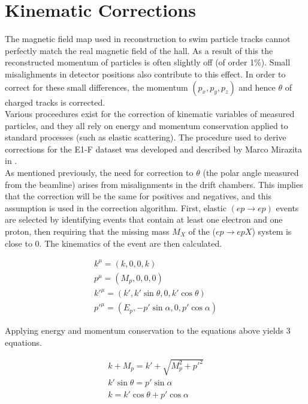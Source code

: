 \section{Kinematic Corrections}
The magnetic field map used in reconstruction to swim particle tracks cannot perfectly match the real magnetic field of the hall.  As a result of this the reconstructed momentum of particles is often slightly off (of order 1\%).  Small misalighments in detector positions also contribute to this effect.  In order to correct for these small differences, the momentum $(p_x, p_y, p_z)$ and hence $\theta$ of charged tracks is corrected. \\

Various proceedures exist for the correction of kinematic variables of measured particles, and they all rely on energy and momentum conservation applied to standard processes (such as elastic scattering).  The procedure used to derive corrections for the E1-F dataset was developed and described by Marco Mirazita in \cite{misc-mirazita:2010}.  \\

As mentioned previously, the need for correction to $\theta$ (the polar angle measured from the beamline) arises from misalignments in the drift chambers.  This implies that the correction will be the same for positives and negatives, and this assumption is used in the correction algorithm.  First, elastic $(ep \rightarrow ep)$ events are selected by identifying events that contain at least one electron and one proton, then requiring that the missing mass $M_X$ of the ($ep \rightarrow epX$) system is close to 0.  The kinematics of the event are then calculated.

\begin{gather}
	k^{\mu} = (k, 0, 0, k)                         \\
	p^{\mu} = (M_{p}, 0, 0, 0)                     \\
	k'^{\mu} = (k', k'\sin\theta, 0, k'\cos\theta) \\
	p'^{\mu} = (E_{p}, -p'\sin\alpha, 0, p'\cos\alpha) 
\end{gather}

Applying energy and momentum conservation to the equations above yields 3 equations.

\begin{gather}
	k + M_p = k' + \sqrt{M_{p}^{2} + p'^2} \\
	k'\sin\theta = p'\sin\alpha            \\
	k = k'\cos\theta + p'\cos\alpha  
\end{gather}

